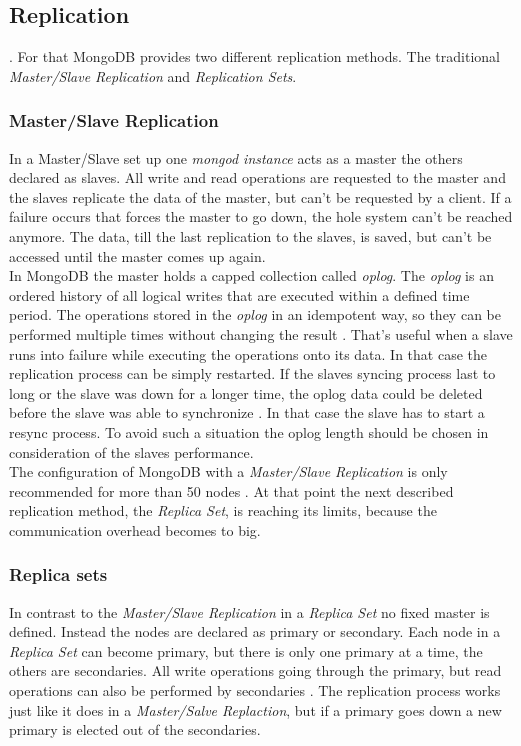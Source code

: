 \subsection{Replication}
. For that MongoDB provides two different replication methods. The traditional \textit{Master/Slave Replication} and \textit{Replication Sets}.

\subsubsection{Master/Slave Replication}
In a Master/Slave set up one \textit{mongod instance} acts as a master the others declared as slaves. All write and read operations are requested to the master and the slaves replicate the data of the master, but can't be requested by a client. If a failure occurs that forces the master to go down, the hole system can't be reached anymore. The data, till the last replication to the slaves, is saved, but can't be accessed until the master comes up again. \\
In MongoDB the master holds a capped collection called \textit{oplog}. The \textit{oplog} is an ordered history of all logical writes that are executed within a defined time period. The operations stored in the \textit{oplog} in an idempotent way, so they can be performed multiple times without changing the result \cite{Edward2015}. That's useful when a slave runs into failure while executing the operations onto its data. In that case the replication process can be simply restarted. If the slaves syncing process last to long or the slave was down for a longer time, the oplog data could be deleted before the slave was able to synchronize \cite{Edward2015}. In that case the slave has to start a resync process. To avoid such a situation the oplog length should be chosen in consideration of the slaves performance.\\
The configuration of MongoDB with a \textit{Master/Slave Replication} is only recommended for more than 50 nodes \cite{Edward2015}. At that point the next described replication method, the \textit{Replica Set}, is reaching its limits, because the communication overhead becomes to big.

\subsubsection{Replica sets}
In contrast to the \textit{Master/Slave Replication} in a \textit{Replica Set} no fixed master is defined. Instead the nodes are declared as primary or secondary. Each node in a \textit{Replica Set} can become primary, but there is only one primary at a time, the others are secondaries. All write operations going through the primary, but read operations can also be performed by secondaries \cite{Edward2015}. The replication process works just like it does in a \textit{Master/Salve Replaction}, but if a primary goes down a new primary is elected out of the secondaries.

